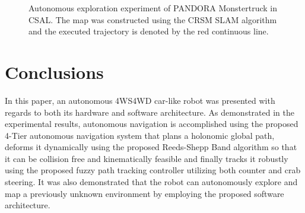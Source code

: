 \documentclass[conference]{IEEEtran}
\begin{document}
\begin{figure}[!ht]
  \centering
  \caption{Autonomous exploration experiment of PANDORA Monstertruck in CSAL. The map was constructed using the CRSM SLAM algorithm and the executed trajectory is denoted by the red continuous line.}
  \label{fig:exploration_exp}
\end{figure}


\section{Conclusions} \label{sec:conclusions}

In this paper, an autonomous 4WS4WD car-like robot was presented with regards to both its hardware and software architecture. As demonstrated in the experimental results, autonomous navigation is accomplished using the proposed 4-Tier autonomous navigation system that plans a holonomic global path, deforms it dynamically using the proposed Reeds-Shepp Band algorithm so that it can be collision free and kinematically feasible and finally tracks it robustly using the proposed fuzzy path tracking controller utilizing both counter and crab steering. It was also demonstrated that the robot can autonomously explore and map a previously unknown environment by employing the proposed software architecture.
\end{document}
